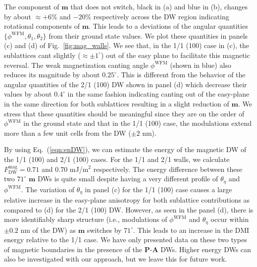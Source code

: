 \documentclass[%
 reprint,
superscriptaddress,
 amsmath,amssymb,
prb,
]{revtex4-1}
\begin{document}
%
The component of $\mathbf{m}$ that does not switch, black in (a) and blue in (b), changes by about $\approx +6\%$ and $-20\%$ respectively across the DW region indicating rotational components of $\mathbf{m}$.
%
This leads to a deviations of the angular quantities $\{\phi^\mathrm{WFM},\theta_1,\theta_2\}$ from their ground state values.
%
We plot these quantities in panels (c) and (d) of Fig.~\ref{fig:mag_walls}.
%
We see that, in the 1/1 (100) case in (c), the sublattices cant slightly ($\approx \pm 1^\circ$) out of the easy plane to facilitate this magnetic reversal.
%
The weak magnetization canting angle $\phi^\mathrm{WFM}$ (shown in blue) also reduces its magnitude by about $0.25^\circ$.
%
This is different from the behavior of the angular quantities of the 2/1 (100) DW shown in panel (d) which decrease their values by about $0.4^\circ$ in the same fashion indicating canting out of the easy-plane in the same direction for both sublattices resulting in a slight reduction of $\mathbf{m}$.
%
We stress that these quantities should be meaningful since they are on the order of $\phi^\mathrm{WFM}$ in the ground state and that in the 1/1 (100) case, the modulations extend more than a few unit cells from the DW ($\pm 2$ nm).
%

%
By using Eq.~(\ref{eqn:enDW}), we can estimate the energy of the magnetic DW of the 1/1 (100) and 2/1 (100) cases.
%
For the 1/1 and 2/1 walls, we calculate $F_\mathrm{DW}^\mathrm{mag} = 0.71$ and $0.70$ mJ/$\mathrm{m}^2$ respectively. 
%
%
The energy difference between these two $71^\circ$ $\mathbf{m}$ DWs is quite small despite having a very different profile of $\theta_\eta$ and $\phi^\mathrm{WFM}$.
%
The variation of $\theta_\eta$ in panel (c) for the 1/1 (100) case causes a large relative increase in the easy-plane anisotropy for both sublattice contributions as compared to (d) for the 2/1 (100) DW.
%
However, as seen in the panel (d), there is more identifiably sharp structure (i.e., modulations of $\phi^\mathrm{WFM}$ and $\theta_\eta$ occur within $\pm 0.2$ nm of the DW) as $\mathbf{m}$ switches by $71^\circ$.
%
This leads to an increase in the DMI energy relative to the 1/1 case. 
%
We have only presented data on these two types of magnetic boundaries in the presence of the $\mathbf{P}$-$\mathbf{A}$ DWs.
%
Higher energy DWs can also be investigated with our approach, but we leave this for future work.
%
%
%
%
\end{document}

